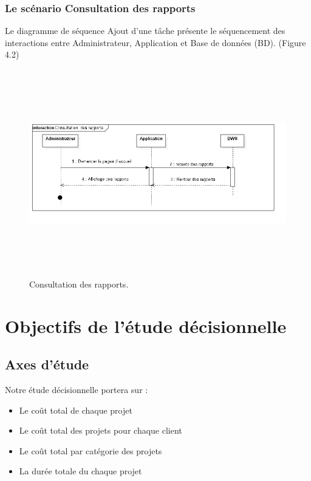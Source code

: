 \subsubsection{Le sc\'{e}nario \guillemotleft{} Consultation des rapports\guillemotright{}}
Le diagramme de s\'{e}quence \guillemotleft{} Ajout d'une t\^{a}che \guillemotright{} pr\'{e}sente le s\'{e}quencement
des interactions entre Administrateur, Application et Base de donn\'{e}es (BD). (Figure 4.2)


\begin{figure}[H]
\center
\includegraphics[width=14cm,height=9cm]{./figures/seq/G.png}
\caption{Consultation des rapports.}
\end{figure}


\section{ Objectifs de l'\'{e}tude d\'{e}cisionnelle }


\subsection{Axes d'\'{e}tude}
Notre \'{e}tude d\'{e}cisionnelle portera sur :

\begin{itemize}
  \item { Le co\^{u}t total de chaque projet}
  \item { Le co\^{u}t total des projets pour chaque client }
  \item { Le co\^{u}t total par cat\'{e}gorie des projets }
  \item { La dur\'{e}e totale du chaque projet }

\end{itemize}


